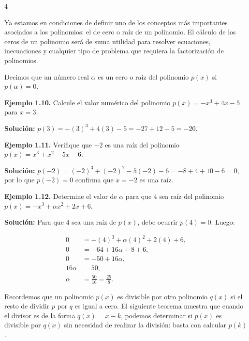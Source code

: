 \documentclass[landscape]{article}
\begin{document}
\begin{landscape}
\begin{multicols}{4}

Ya estamos en condiciones de definir uno de los conceptos más importantes asociados a los polinomios: el de cero o raíz de un polinomio. El cálculo de los ceros de un polinomio será de suma utilidad para resolver ecuaciones, inecuaciones y cualquier tipo de problema que requiera la factorización de polinomios.

\begin{tcolorbox}[colback=blue!5!white,colframe=blue!75!black,title=\textbf{Definición (Cero o raíz de un polinomio)}]
Decimos que un número real $\alpha$ es un cero o raíz del polinomio $p(x)$ si $p(\alpha) = 0$.
\end{tcolorbox}

\noindent\textbf{Ejemplo 1.10.} Calcule el valor numérico del polinomio $p(x) = -x^3 + 4x - 5$ para $x = 3$.

\noindent\textbf{Solución:}
$p(3) = -(3)^3 + 4(3) - 5 = -27 + 12 - 5 = -20$.

\columnbreak

\noindent\textbf{Ejemplo 1.11.} Verifique que $-2$ es una raíz del polinomio $p(x) = x^3 + x^2 - 5x - 6$.

\noindent\textbf{Solución:}
$p(-2) = (-2)^3 + (-2)^2 - 5(-2) - 6 = -8 + 4 + 10 - 6 = 0$,
por lo que $p(-2)=0$ confirma que $x=-2$ es una raíz.

\noindent\textbf{Ejemplo 1.12.} Determine el valor de $\alpha$ para que $4$ sea raíz del polinomio $p(x) = -x^3 + \alpha x^2 + 2x + 6$.

\noindent\textbf{Solución:} Para que $4$ sea una raíz de $p(x)$, debe ocurrir $p(4) = 0$. Luego:

\begin{align*}
0 &= -(4)^3 + \alpha (4)^2 + 2(4) + 6,\\
0 &= -64 + 16\alpha + 8 + 6,\\
0 &= -50 + 16\alpha,\\
16\alpha &= 50,\\
\alpha &= \frac{50}{16} = \frac{25}{8}.
\end{align*}

\columnbreak

Recordemos que un polinomio $p(x)$ es divisible por otro polinomio $q(x)$ si el resto de dividir $p$ por $q$ es igual a cero. El siguiente teorema muestra que cuando el divisor es de la forma $q(x) = x - k$, podemos determinar si $p(x)$ es divisible por $q(x)$ sin necesidad de realizar la división: basta con calcular $p(k)$.


\end{multicols}
\end{landscape}
\end{document}
